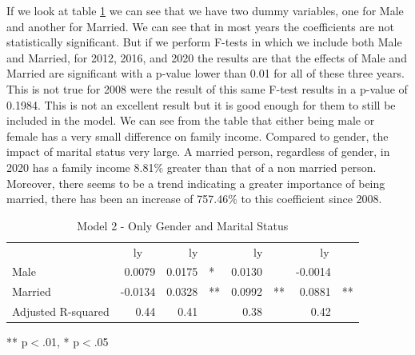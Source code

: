 \documentclass[12pt]{article}
\begin{document}
\begin{spacing}{1.5}

If we look at table \ref{table:gender2} we can see that we have two dummy variables, one for Male and another for Married. We can see that in most years the coefficients are not statistically significant. But if we perform F-tests in which we include both Male and Married, for 2012, 2016, and 2020 the results are that the effects of Male and Married are significant with a p-value lower than 0.01 for all of these three years. This is not true for 2008 were the result of this same F-test results in a p-value of 0.1984. This is not an excellent result but it is good enough for them to still be included in the model. We can see from the table that either being male or female has a very small difference on family income. Compared to gender, the impact of marital status very large. A married person, regardless of gender, in 2020 has a family income 8.81\% greater than that of a non married person. Moreover, there seems to be a trend indicating a greater importance of being married, there has been an increase of 757.46\% to this coefficient since 2008.

\begin{table}[!h]
\caption{Model 2 - Only Gender and Marital Status}
\centering
\begin{tabular}{llllllll}
\cline{1-8}
\multicolumn{1}{r}{} &
  \multicolumn{1}{c}{ly} &
  \multicolumn{2}{c}{ly} &
  \multicolumn{2}{c}{ly} &
  \multicolumn{2}{c}{ly} \\
\cline{1-8}
\multicolumn{1}{l}{Male} &
  \multicolumn{1}{r}{0.0079} &
  \multicolumn{1}{r}{0.0175} &
  \multicolumn{1}{l}{*} &
  \multicolumn{1}{r}{0.0130} &
  \multicolumn{1}{l}{} &
  \multicolumn{1}{r}{-0.0014} &
  \multicolumn{1}{l}{} \\
\multicolumn{1}{l}{Married} &
  \multicolumn{1}{r}{-0.0134} &
  \multicolumn{1}{r}{0.0328} &
  \multicolumn{1}{l}{**} &
  \multicolumn{1}{r}{0.0992} &
  \multicolumn{1}{l}{**} &
  \multicolumn{1}{r}{0.0881} &
  \multicolumn{1}{l}{**} \\
\multicolumn{1}{l}{Adjusted R-squared} &
  \multicolumn{1}{r}{0.44} &
  \multicolumn{1}{r}{0.41} &
  \multicolumn{1}{l}{} &
  \multicolumn{1}{r}{0.38} &
  \multicolumn{1}{l}{} &
  \multicolumn{1}{r}{0.42} &
  \multicolumn{1}{l}{} \\
\cline{1-8}
\end{tabular}

\footnotesize{
** p$<$.01, * p$<$.05
}
\label{table:gender2}
\end{table}



\end{spacing}
\end{document}
